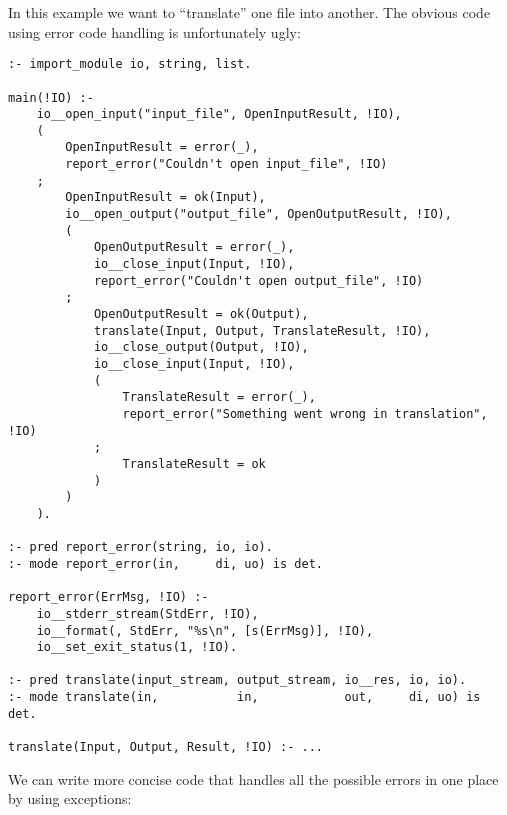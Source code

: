 In this example we want to ``translate'' one file into another.  The
obvious code using error code handling is unfortunately ugly:
\begin{verbatim}
:- import_module io, string, list.

main(!IO) :-
    io__open_input("input_file", OpenInputResult, !IO),
    (
        OpenInputResult = error(_),
        report_error("Couldn't open input_file", !IO)
    ;
        OpenInputResult = ok(Input),
        io__open_output("output_file", OpenOutputResult, !IO),
        (
            OpenOutputResult = error(_),
            io__close_input(Input, !IO),
            report_error("Couldn't open output_file", !IO)
        ;
            OpenOutputResult = ok(Output),
            translate(Input, Output, TranslateResult, !IO),
            io__close_output(Output, !IO),
            io__close_input(Input, !IO),
            (
                TranslateResult = error(_),
                report_error("Something went wrong in translation", !IO)
            ;
                TranslateResult = ok
            )
        )
    ).

:- pred report_error(string, io, io).
:- mode report_error(in,     di, uo) is det.

report_error(ErrMsg, !IO) :-
    io__stderr_stream(StdErr, !IO),
    io__format(, StdErr, "%s\n", [s(ErrMsg)], !IO),
    io__set_exit_status(1, !IO).

:- pred translate(input_stream, output_stream, io__res, io, io).
:- mode translate(in,           in,            out,     di, uo) is det.

translate(Input, Output, Result, !IO) :- ...
\end{verbatim}
We can write more concise code that handles all the possible errors in
one place by using exceptions:
